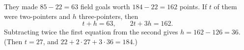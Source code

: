 They made $85-22=63$ field goals worth $184-22=162$ points. If $t$ of them were two-pointers and $h$ three-pointers, then
\[t+h=63,\qquad2t+3h=162.\]
Subtracting twice the first equation from the second gives $h=162-126=\boxed{36}$. (Then $t=27$, and $22+2\cdot27+3\cdot36=184$.)
